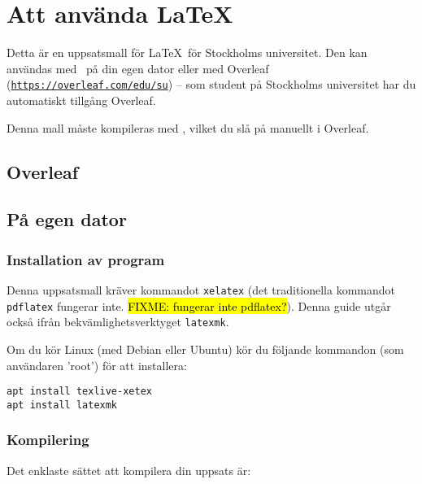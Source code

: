 
\section{Att använda {\rmfamily\LaTeX}}
\label{latex}

Detta är en uppsatsmall för \LaTeX\ för Stockholms universitet. Den kan
användas med \XeLaTeX\ på din egen dator eller med Overleaf
(\texttt{\href{https://overleaf.com/edu/su}{https://\linebreak[0]{}overleaf\linebreak[0]{}.com/\linebreak[0]{}edu/\linebreak[0]{}su}})
-- som student på Stockholms universitet har du automatiskt tillgång Overleaf.

Denna mall måste kompileras med \XeLaTeX, vilket du slå på manuellt i Overleaf.

\subsection{Overleaf}


\subsection{På egen dator}

\subsubsection{Installation av program}

Denna uppsatsmall kräver kommandot \texttt{xelatex} (det traditionella
kommandot \texttt{pdflatex} fungerar inte. \hl{FIXME: fungerar inte
pdflatex?}). Denna guide utgår också ifrån bekvämlighetsverktyget
\texttt{latexmk}.

\noindent Om du kör Linux (med Debian eller Ubuntu) kör du följande kommandon (som
användaren 'root') för att installera:

\begin{verbatim}
apt install texlive-xetex
apt install latexmk
\end{verbatim}


\subsubsection{Kompilering}

Det enklaste sättet att kompilera din uppsats är:

